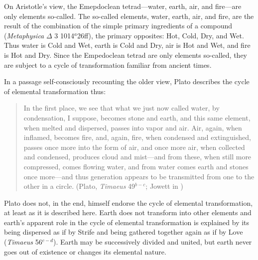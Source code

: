 On Aristotle's view, the Emepdoclean tetrad---water, earth, air, and fire---are only elements so-called. The so-called elements, water, earth, air, and fire, are the result of the combination of the simple primary ingredients of a compound (\emph{Metaphysica} \( \Delta \) 3 1014\( ^{a} \)26ff), the primary opposites: Hot, Cold, Dry, and Wet. Thus water is Cold and Wet, earth is Cold and Dry, air is Hot and Wet, and fire is Hot and Dry. Since the Empedoclean tetrad are only elements so-called, they are subject to a cycle of transformation familiar from ancient times. 

In a passage self-consciously recounting the older view, Plato describes the cycle of elemental transformation thus:
\begin{quote}
	In the first place, we see that what we just now called water, by condensation, I suppose, becomes stone and earth, and this same element, when melted and dispersed, passes into vapor and air. Air, again, when inflamed, becomes fire, and, again, fire, when condensed and extinguished, passes once more into the form of air, and once more air, when collected and condensed, produces cloud and mist---and from these, when still more compressed, comes flowing water, and from water comes earth and stones once more---and thus generation appears to be transmitted from one to the other in a circle. (Plato, \emph{Timaeus} 49\( ^{b-c} \); Jowett in \citealt[1176]{Hamilton:1989fk})
\end{quote}
Plato does not, in the end, himself endorse the cycle of elemental transformation, at least as it is described here. Earth does not transform into other elements and earth's apparent role in the cycle of elemental transformation is explained by its being dispersed as if by Strife and being gathered together again as if by Love (\emph{Timaeus} 56\( ^{c-d} \)). Earth may be successively divided and united, but earth never goes out of existence or changes its elemental nature.

